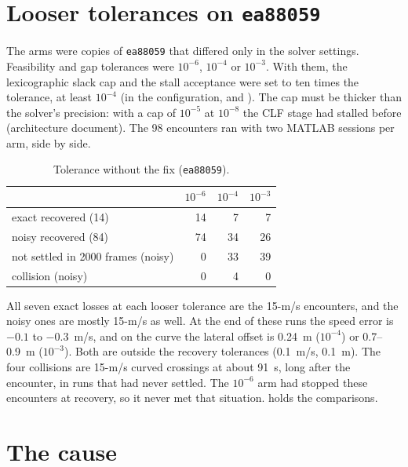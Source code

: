 \documentclass[11pt]{article}
\begin{document}
\section{Looser tolerances on \texttt{ea88059}}
The arms were copies of \texttt{ea88059} that differed only in the solver
settings. Feasibility and gap tolerances were $10^{-6}$, $10^{-4}$ or
$10^{-3}$. With them, the lexicographic slack cap and the stall acceptance
were set to ten times the tolerance, at least $10^{-4}$ (in the
configuration,  and
). The cap must be thicker than the solver's
precision: with a cap
of $10^{-5}$ at $10^{-8}$ the CLF stage had stalled before (architecture
document). The 98 encounters ran with two MATLAB sessions per arm, side by
side.

\begin{table}[h]
\centering\small
\caption{Tolerance without the fix (\texttt{ea88059}).}
\begin{tabular}{lrrr}
\toprule
 & $10^{-6}$ & $10^{-4}$ & $10^{-3}$\\
\midrule
exact recovered (14) & 14 & 7 & 7\\
noisy recovered (84) & 74 & 34 & 26\\
not settled in 2000 frames (noisy) & 0 & 33 & 39\\
collision (noisy) & 0 & 4 & 0\\
\bottomrule
\end{tabular}
\end{table}

All seven exact losses at each looser tolerance are the 15-m/s encounters,
and the noisy ones are mostly 15-m/s as well. At the end of these runs the
speed error is $-0.1$ to $-0.3$~m/s, and on the curve the lateral offset is
0.24~m ($10^{-4}$) or 0.7--0.9~m ($10^{-3}$). Both are outside the recovery
tolerances (0.1~m/s, 0.1~m). The four collisions are 15-m/s curved
crossings at about 91~s, long after the encounter, in runs that had never
settled. The $10^{-6}$ arm had stopped these encounters at recovery, so it
never met that situation.  holds the comparisons.

\section{The cause}
\end{document}
